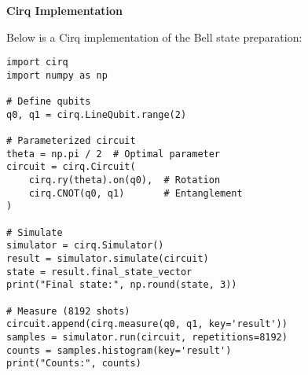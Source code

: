 
\vspace{0.3cm}


\noindent
\textbf{Cirq Implementation}

Below is a Cirq implementation of the Bell state preparation:

\begin{verbatim}
import cirq
import numpy as np

# Define qubits
q0, q1 = cirq.LineQubit.range(2)

# Parameterized circuit
theta = np.pi / 2  # Optimal parameter
circuit = cirq.Circuit(
    cirq.ry(theta).on(q0),  # Rotation
    cirq.CNOT(q0, q1)       # Entanglement
)

# Simulate
simulator = cirq.Simulator()
result = simulator.simulate(circuit)
state = result.final_state_vector
print("Final state:", np.round(state, 3))

# Measure (8192 shots)
circuit.append(cirq.measure(q0, q1, key='result'))
samples = simulator.run(circuit, repetitions=8192)
counts = samples.histogram(key='result')
print("Counts:", counts)
\end{verbatim}


